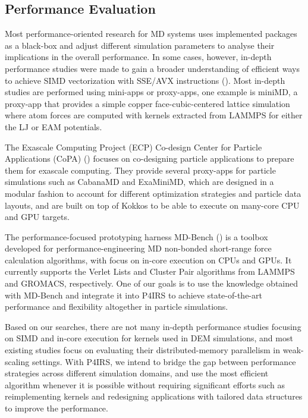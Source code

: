 \documentclass[Afour,sageh,times]{sagej}
\newcommand{\RMchange}[1]{{\color{blue} #1}}
\begin{document}
\subsection{Performance Evaluation}
\label{sec:perfeval}

Most performance-oriented research for \ac{MD} systems uses implemented packages as a black-box and adjust different simulation parameters to analyse their implications in the overall performance.
In some cases, however, in-depth performance studies were made to gain a broader understanding of efficient ways to achieve SIMD vectorization with SSE/AVX instructions (\cite{mdsimd}).
Most in-depth studies are performed using mini-apps or proxy-apps, one example is miniMD, a proxy-app that provides a simple copper face-cubic-centered lattice simulation where atom forces are computed with kernels extracted from LAMMPS for either the \ac{LJ} or \ac{EAM} potentials.

The Exascale Computing Project (ECP) Co-design Center for Particle Applications (CoPA) (\cite{ecpcopa}) focuses on co-designing particle applications to prepare them for exascale computing.
They provide several proxy-apps for particle simulations such as CabanaMD and ExaMiniMD, which are designed in a modular fashion to account for different optimization strategies and particle data layouts, and are built on top of Kokkos to be able to execute on many-core CPU and GPU targets.

The performance-focused prototyping harness MD-Bench (\cite{mdbench1,mdbench2}) is a toolbox developed for performance-engineering \ac{MD} non-bonded short-range force calculation algorithms, with focus on in-core execution on CPUs and GPUs.
It currently supports the Verlet Lists and Cluster Pair algorithms from LAMMPS and GROMACS, respectively.
One of our goals is to use the knowledge obtained with MD-Bench and integrate it into P4IRS to achieve state-of-the-art performance and flexibility altogether in particle simulations.

Based on our searches, there are not many in-depth performance studies focusing on SIMD and in-core execution for kernels used in DEM simulations, and most existing studies focus on evaluating their distributed-memory parallelism in weak-scaling settings.
With P4IRS, we intend to bridge the gap between performance strategies across different simulation domains, and use the most efficient algorithm whenever it is possible without requiring significant efforts such as reimplementing kernels and redesigning applications with tailored data structures \RMchange{to improve} the performance.
\end{document}
